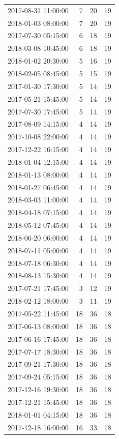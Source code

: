\begin{tabular}{lrrr}
2017-08-31 11:00:00 & 7 & 20 & 19 \\
2018-01-03 08:00:00 & 7 & 20 & 19 \\
2017-07-30 05:15:00 & 6 & 18 & 19 \\
2018-03-08 10:45:00 & 6 & 18 & 19 \\
2018-01-02 20:30:00 & 5 & 16 & 19 \\
2018-02-05 08:45:00 & 5 & 15 & 19 \\
2017-01-30 17:30:00 & 5 & 14 & 19 \\
2017-05-21 15:45:00 & 5 & 14 & 19 \\
2017-07-30 17:45:00 & 5 & 14 & 19 \\
2017-08-09 14:15:00 & 4 & 14 & 19 \\
2017-10-08 22:00:00 & 4 & 14 & 19 \\
2017-12-22 16:15:00 & 4 & 14 & 19 \\
2018-01-04 12:15:00 & 4 & 14 & 19 \\
2018-01-13 08:00:00 & 4 & 14 & 19 \\
2018-01-27 06:45:00 & 4 & 14 & 19 \\
2018-03-03 11:00:00 & 4 & 14 & 19 \\
2018-04-18 07:15:00 & 4 & 14 & 19 \\
2018-05-12 07:45:00 & 4 & 14 & 19 \\
2018-06-20 06:00:00 & 4 & 14 & 19 \\
2018-07-11 05:00:00 & 4 & 14 & 19 \\
2018-07-18 06:30:00 & 4 & 14 & 19 \\
2018-08-13 15:30:00 & 4 & 14 & 19 \\
2017-07-21 17:45:00 & 3 & 12 & 19 \\
2018-02-12 18:00:00 & 3 & 11 & 19 \\
2017-05-22 11:45:00 & 18 & 36 & 18 \\
2017-06-13 08:00:00 & 18 & 36 & 18 \\
2017-06-16 17:45:00 & 18 & 36 & 18 \\
2017-07-17 18:30:00 & 18 & 36 & 18 \\
2017-09-21 17:30:00 & 18 & 36 & 18 \\
2017-09-24 05:15:00 & 18 & 36 & 18 \\
2017-12-16 19:30:00 & 18 & 36 & 18 \\
2017-12-21 15:45:00 & 18 & 36 & 18 \\
2018-01-01 04:15:00 & 18 & 36 & 18 \\
2017-12-18 16:00:00 & 16 & 33 & 18 \\

\end{tabular}
